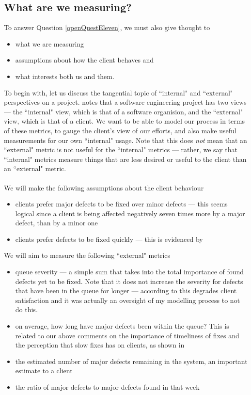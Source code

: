 \subsection{What are we measuring?}

To answer Question \ref{openQuestEleven}, we must also give thought to 
\begin{itemize}
	\item what we are measuring
	\item assumptions about how the client behaves and
	\item what interests both us and them.
\end{itemize}

To begin with, let us discuss the tangential topic of ``internal" and ``external"
perspectives on a project.
\FIXME notes that a software engineering project has two views --- the ``internal" view, which is
that of a software organision, and the ``external" view, which is that of a client.
We want to be able to model our process in terms of these metrics, to gauge the client's view of our
efforts, and also make useful measurements for our own ``internal" usage.
Note that this does {\em not} mean that an ``external" metric is not useful for the ``internal"
metrics --- rather, we say that ``internal" metrics measure things that are less desired or useful
to the client than an ``external" metric.\\
\\
We will make the following assumptions about the client behaviour
\begin{itemize}
	\item clients prefer major defects to be fixed over minor defects --- this seems logical since a
client is being affected negatively seven times more by a major defect, than by a minor one
	\item clients prefer defects to be fixed quickly --- this is evidenced by \FIXME
\end{itemize}

We will aim to measure the following ``external" metrics
\begin{itemize}
	\item queue severity --- a simple sum that takes into the total importance of found defects yet to
be fixed.
	Note that it does not increase the severity for defects that have been in the queue for longer ---
according to \FIXME this degrades client satisfaction and it was actually an oversight of my
modelling process to not do this.
	\item on average, how long have major defects been within the queue?
	This is related to our above comments on the importance of timeliness of fixes and the perception
that slow fixes has on clients, as shown in \FIXME
	\item the estimated number of major defects remaining in the system, an important estimate to a
client
	\item the ratio of major defects to major defects found in that week
\end{itemize}

